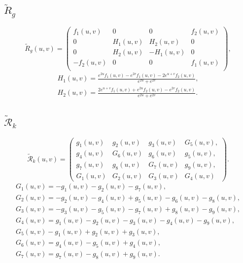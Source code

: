 \documentclass{article}
\begin{document}
\subsection{$\tilde{R}_{g}$}
\begin{equation}
   \tilde{R}_g(u,v)= \left(
\begin{array}{cccc}
 f_1(u,v) & 0 & 0 & f_2(u,v) \\
 0 & H_1(u,v) & H_2(u,v) & 0 \\
 0 & H_2 (u,v)&-H_1(u,v) & 0 \\
 -f_2(u,v) & 0 & 0 & f_1(u,v) \\
\end{array}
\right),
\end{equation}
\begin{equation}
\begin{aligned}
   H_1(u,v)=\frac{e^{2 u} f_1(u,v)-e^{2 v} f_1(u,v)-2 e^{u+v} f_2(u,v)}{e^{2 u}+e^{2 v}}, \\
    H_2(u,v)=\frac{2 e^{u+v} f_1(u,v)+e^{2 u} f_2(u,v)-e^{2 v} f_2(u,v)}{e^{2 u}+e^{2 v}}.
\end{aligned}
\end{equation}

\subsection{$\tilde{\mathcal{R}}_{k}$}
\begin{equation}
    \tilde{\mathcal{R}}_k(u,v)=\begin{pmatrix}
       g_1(u,v) & g_2(u,v) & g_3(u,v) & G_5(u,v), \\
 g_4(u,v) & G_6(u,v) & g_6(u,v) & g_5(u,v) ,\\
 g_7(u,v) & g_8(u,v) & G_7(u,v) & g_{9}(u,v), \\
G_1(u,v) &G_2(u,v) & G_3(u,v) & G_4(u,v)
    \end{pmatrix}.
\end{equation}
\begin{equation}
\begin{aligned}
    G_1(u,v)=  -g_1(u,v)-g_2(u,v)-g_7(u,v), \\
    G_2(u,v)= -g_2(u,v)-g_4(u,v)+g_5(u,v)-g_6(u,v)-g_8(u,v),\\
    G_3(u,v)=-g_3(u,v)-g_5(u,v)-g_7(u,v)+g_8(u,v)-g_9(u,v),\\
   G_4(u,v)= g_1(u,v)-g_2(u,v)-g_3(u,v)-g_4(u,v)-g_9(u,v),\\
 G_5(u,v)  -g_1(u,v)+g_2(u,v)+g_3(u,v),\\
 G_6(u,v)=g_4(u,v)-g_5(u,v)+g_4(u,v),\\
 G_7(u,v)=g_7(u,v)-g_8(u,v)+g_{9}(u,v).
\end{aligned}
\end{equation}
\end{document}
